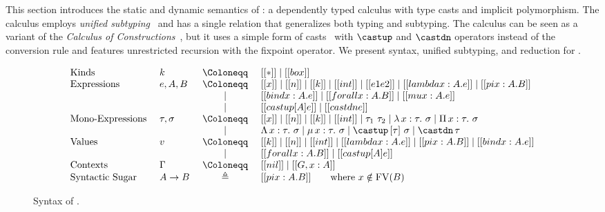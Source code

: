 \section{\System}
\label{sec:system}

This section introduces the static and dynamic semantics of
\name: a dependently typed calculus with type casts
and implicit polymorphism. The calculus employs
\emph{unified subtyping}~\citep{full}
and has a single relation that generalizes both typing and subtyping.
The calculus can be seen as a variant of the \emph{Calculus of Constructions}~\citep{coc},
but it uses a simple form of casts~\citep{isotype,yang2019pure} with $\castup$ and $\castdn$ operators
instead of the conversion rule and features unrestricted recursion with the fixpoint operator.
We present syntax, unified subtyping, and reduction for \name.

\begin{figure}[t]
\centering
\begin{equation*}
\begin{array}{llcl}
    \text{Kinds} & k & ~\Coloneqq ~ & [[*]] \mid [[box]] \\
    \text{Expressions} & e, A, B & ~ \Coloneqq ~ & [[x]] \mid [[n]] \mid [[k]] \mid [[int]] \mid [[e1 e2]] \mid [[lambda x : A. e]] \mid [[pi x : A. B]] \\
        & & \mid & [[bind x : A. e]] \mid [[forall x : A. B]] \mid [[mu x : A. e]] \\
        & & \mid & [[castup [A] e]] \mid [[castdn e]]   \\
    \text{Mono-Expressions} ~ & \tau, \sigma & ~ \Coloneqq ~ & [[x]] \mid [[n]] \mid [[k]] \mid [[int]] \mid \tau_1 ~ \tau_2 \mid \lambda \, x : \tau. ~ \sigma \mid \Pi \, x : \tau. ~ \sigma \\
        & & \mid & \Lambda \, x : \tau. ~ \sigma \mid \mu \, x : \tau. ~ \sigma \mid \castup \, [\tau]~ \sigma \mid \castdn \, \tau \\
    \text{Values} & v & ~ \Coloneqq ~ & [[k]] \mid [[n]] \mid [[int]] \mid [[lambda x : A. e]] \mid [[pi x : A. B]] \mid [[bind x : A. e]] \\
        & & \mid & [[forall x : A. B]] \mid [[castup [A] e]] \\
    \text{Contexts} & \Gamma & ~ \Coloneqq ~ & [[nil]] \mid [[G , x : A]] \\
    \text{Syntactic Sugar} ~ & A \rightarrow B & \triangleq & [[pi x : A. B]] \qquad \text{where} ~ x \notin \mathrm{FV}(B)
\end{array}
\end{equation*}
\caption{Syntax of \name.}
\label{fig:syntax}
\end{figure}
